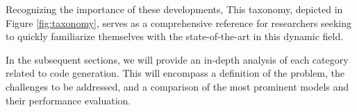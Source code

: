 Recognizing the importance of these developments, 
This taxonomy, depicted in Figure \ref{fig:taxonomy}, serves as a comprehensive reference for researchers seeking to quickly familiarize themselves with the state-of-the-art in this dynamic field.

In the subsequent sections, we will provide an in-depth analysis of each category related to code generation. This will encompass a definition of the problem, the challenges to be addressed, and a comparison of the most prominent models and their performance evaluation.

